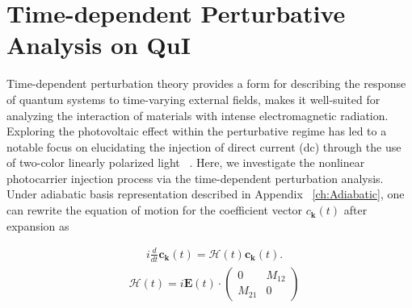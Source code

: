 \section{Time-dependent Perturbative Analysis on QuI \label{sec:deriveperturbation}}
Time-dependent perturbation theory provides a form for describing the response of quantum systems to time-varying external fields, makes it well-suited for analyzing the interaction of materials with intense electromagnetic radiation. 
Exploring the photovoltaic effect within the perturbative regime has led to a notable focus on elucidating the injection of direct current (dc) through the use of two-color linearly polarized light ~\cite{PhysRevLett.74.3596,PhysRevLett.76.1703,PhysRevLett.78.306,Sun2010,PhysRevB.100.075202,HeideBoolakeeEcksteinHommelhoff+2021+3701+3707,PhysRevLett.123.067402}. 
Here, we investigate the nonlinear photocarrier injection process via the time-dependent perturbation analysis.
Under adiabatic basis representation described in Appendix ~\ref{ch:Adiabatic}, one can rewrite the equation of motion for the coefficient vector $c_{\mathbf k} (t)$ after expansion as

\begin{align}
&i\frac{d}{dt} \mathbf c_{\mathbf k}(t) = \mathcal{H}(t) \mathbf c_{\mathbf k}(t).
	\label{eq:tdse-ad-basis}
\end{align}
\begin{align}
&\mathcal{H}(t)= 
 i\mathbf E(t)\cdot \left(
    \begin{array}{cc}
        0 & M_{12}\\
        M_{21} & 0
    \end{array}
    \right)
\end{align}


